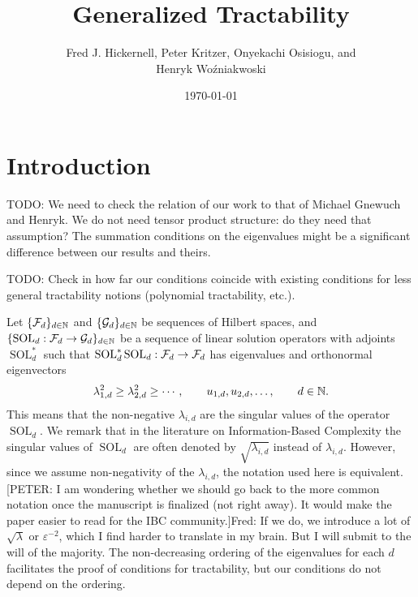 \documentclass[11pt,a4paper]{article}
\DeclareMathOperator{\SOL}{SOL}
\newcommand{\fred}[1]{\begingroup\color{blue}#1\endgroup}
\newcommand{\peter}[1]{\begingroup\color{purple}#1\endgroup}
\newcommand{\kachi}[1]{\begingroup\color{ForestGreen}#1\endgroup}
\begin{document}
\newtheorem{theorem}{Theorem}
\theoremstyle{definition}
\newtheorem{definition}{Definition}
\newtheorem{example}{Example}

\title{Generalized Tractability}
\author{\fred{Fred J. Hickernell}, \peter{Peter Kritzer}, \kachi{Onyekachi Osisiogu}, and \\ Henryk Wo\'zniakwoski}
\date{\today}

\maketitle

\section{Introduction}

TODO: We need to check the relation of our work to that of Michael Gnewuch and Henryk. We do not need tensor product structure: do they need that assumption? The summation conditions on the eigenvalues might be a significant difference between our results and theirs.

\medskip

TODO: Check in how far our conditions coincide with existing conditions for less general tractability notions (polynomial tractability, etc.).

\medskip

Let $\{\mathcal{F}_d\}_{d \in \mathbb{N}}$ and $\{\mathcal{G}_d\}_{d \in \mathbb{N}}$ be sequences of Hilbert spaces, and $\{\SOL_d : \cf_d \to \cg_d\}_{d \in \naturals}$ be a sequence of linear solution operators  with adjoints $\SOL_d^*$ such that $\SOL_d^*\SOL_d : \cf_d \to \cf_d$ has eigenvalues and orthonormal eigenvectors
\begin{equation} \label{eq:eigenvalues}
 \lambda_{1,d}^2 \ge \lambda_{2,d}^2 \ge \cdots, \qquad u_{1,d}, u_{2,d}, \ldots, \qquad d \in \mathbb{N}.
\end{equation}
This means that the non-negative $\lambda_{i,d}$ are the singular values of the operator $\SOL_d$. We remark that in the literature on Information-Based Complexity the singular values of $\SOL_d$ are often denoted by $\sqrt{\lambda_{i,d}}$ instead of $\lambda_{i,d}$. However, since we assume non-negativity of the $\lambda_{i,d}$, the notation used here is equivalent. 
\peter{[PETER: I am wondering whether we should go back to the more common notation once the manuscript is finalized (not right away). It would make the paper easier to read for the IBC community.]}\fred{Fred: If we do, we introduce a lot of $\sqrt{\lambda}$ or $\varepsilon^{-2}$, which I find harder to translate in my brain.  But I  will submit to the will of the majority.}
The non-decreasing ordering of the eigenvalues for each $d$ facilitates the proof of conditions for tractability, but our conditions do not depend on the ordering.
\end{document}
